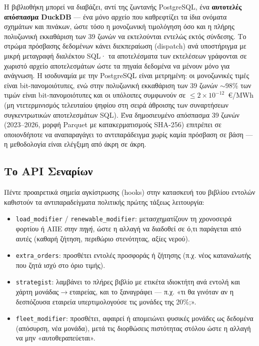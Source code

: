 Η βιβλιοθήκη μπορεί να διαβάζει, αντί της ζωντανής PostgreSQL, ένα \textbf{αυτοτελές απόσπασμα DuckDB} --- ένα μόνο αρχείο που καθρεφτίζει τα ίδια ονόματα σχημάτων και πινάκων, ώστε τόσο η μονοζωνική τιμολόγηση όσο και η πλήρης πολυζωνική εκκαθάριση των 39 ζωνών να εκτελούνται εντελώς εκτός σύνδεσης. Το στρώμα πρόσβασης δεδομένων κάνει διεκπεραίωση (dispatch) ανά υποστήριγμα με μικρή μεταγραφή διαλέκτου SQL· τα αποτελέσματα των εκτελέσεων γράφονται σε χωριστό αρχείο αποτελεσμάτων ώστε τα πηγαία δεδομένα να μένουν μόνο για ανάγνωση. Η ισοδυναμία με την PostgreSQL είναι μετρημένη: οι μονοζωνικές τιμές είναι bit-πανομοιότυπες, ενώ στην πολυζωνική εκκαθάριση των 39 ζωνών $\sim$98\% των τιμών είναι bit-πανομοιότυπες και οι υπόλοιπες συμφωνούν σε $\le 2 \times 10^{-12}$~€/MWh (μη ντετερμινισμός τελευταίου ψηφίου στη σειρά άθροισης των συναρτήσεων συγκεντρωτικών αποτελεσμάτων SQL). Ένα δημοσιευμένο απόσπασμα 39 ζωνών (2023--2026, μορφή Parquet με κατακερματισμούς SHA-256) επιτρέπει σε οποιονδήποτε να αναπαραγάγει το αντιπαράδειγμα χωρίς καμία πρόσβαση σε βάση --- η μεθοδολογία είναι ελέγξιμη από άκρη σε άκρη.

\subsection{Το API Σεναρίων}
\label{subsec:scenario-api}

Πέντε προαιρετικά σημεία αγκίστρωσης (hooks) στην κατασκευή του βιβλίου εντολών καθιστούν τα αντιπαραδείγματα πολιτικής πρώτης τάξεως λειτουργία:

\begin{itemize}
\item \texttt{load\_modifier} / \texttt{renewable\_modifier}: μετασχηματίζουν τη χρονοσειρά φορτίου ή ΑΠΕ \emph{στην πηγή}, ώστε η αλλαγή να διαδοθεί σε ό,τι παράγεται από αυτές (καθαρή ζήτηση, περιθώριο στενότητας, αξίες νερού).
\item \texttt{extra\_orders}: προσθέτει εντολές προσφοράς ή ζήτησης (π.χ. νέος καταναλωτής που ζητά ισχύ στο όριο τιμής).
\item \texttt{strategist}: λαμβάνει το πλήρες βιβλίο με ετικέτα ιδιοκτήτη ανά εντολή και χάρτη μονάδας$\to$εταιρείας, και το ξαναγράφει --- π.χ. «τι θα γινόταν αν η δεσπόζουσα εταιρεία υπερτιμολογούσε τις μονάδες της 20\%;».
\item \texttt{fleet\_modifier}: προσθέτει, αφαιρεί ή απομειώνει φυσικές μονάδες ως δεδομένα (απόσυρση, νέα μονάδα), μετά τις διορθώσεις πιστότητας στόλου ώστε η αλλαγή να μην «αυτοθεραπεύεται».
\end{itemize}

